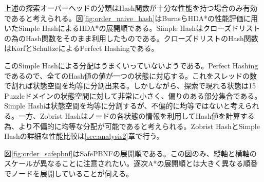 \documentclass[uplatex]{jsarticle}
\begin{document}
上述の探索オーバーヘッドの分類はHash関数が十分な性能を持つ場合のみ有効であると考えられる。図\ref{fig:order_naive_hash}はBurnsらHDA*の性能評価に用いたSimple HashによるHDA*の展開順である。Simple Hashはクローズドリストの為のHash関数をそのまま利用したものである。クローズドリストのHash関数はKorfとSchultzeによるPerfect Hashingである\cite{korf2005large}。

このSimple Hashによる分配はうまくいっていないようである。Perfect Hashingであるので、全てのHash値の値が一つの状態に対応する。これをスレッドの数で割れば状態空間を均等に分割出来る。しかしながら、探索で現れる状態は15 Puzzleドメインの状態空間に対して非常に小さく、偏りのある部分集合である。Simple Hashは状態空間を均等に分割するが、不偏的に均等ではないと考えられる。一方、Zobrist Hashはノードの各状態の情報を利用してHash値を計算する為、より不偏的に均等な分配が可能であると考えられる。Zobrist HashとSimple Hashの詳細な性能比較は\ref{sec:analysis2}章で行う。

\begin{comment}
状態$s$は整数列$\mathbf{x} = (x_{0}, x_{1}, …, x_{n})$で表せられるとする。Simple Hashは状態$s$をに対して以下の式で与えられる。
\newline
\begin{equation}
	H(s) = \sum\nolimits_{i = 0}^{n}x_{i} l_{i}
\end{equation}

Simple Hash分配はうまくいっていないようである。
15 Puzzleドメインの場合、$x_{i}$は各タイルの位置を表し、$l_{i}$は全て16である。スレッドの数が2, 4, 8, 16の場合、Simple Hashは15 Puzzleドメインの状態空間を均等に分割する。しかしながら、この時Hash値は$x_{0}$の値のみに依存する。状態の一部分の情報しか利用していない為、状態空間に対して\textbf{不偏的に}均等な分割をすることが出来ない。探索で現れる状態は15 Puzzleドメインの状態空間に対して非常に小さく、偏りのある部分集合である。よって、Simple HashはA*探索で現れるノードを均等に分配することは出来ないと考えられる。Zobrist HashとSimple Hashの詳細な性能比較は\ref{sec:analysis2}章で行う。
\newline
\end{comment}


図\ref{fig:order_safepbnf}はSafePBNFの展開順である。この図のみ、縦軸と横軸のスケールが異なることに注意されたい。逐次A*の展開順とは大きく異なる順番でノードを展開していることが伺える。
\newline
\end{document}

